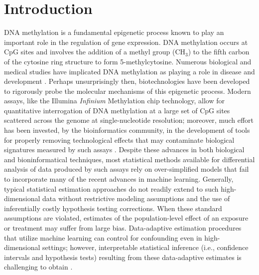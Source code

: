 \documentclass[9pt,a4paper,]{extarticle}
\theoremstyle{definition}
\theoremstyle{definition}
\theoremstyle{definition}
\theoremstyle{remark}
\begin{document}
\hypertarget{introduction}{%
\section{Introduction}\label{introduction}}

DNA methylation is a fundamental epigenetic process known to play an important
role in the regulation of gene expression. DNA methylation occurs at CpG sites
and involves the addition of a methyl group (\(\text{CH}_3\)) to the fifth carbon
of the cytosine ring structure to form 5-methylcytosine. Numerous biological and
medical studies have implicated DNA methylation as playing a role in disease and
development \citep{robertson2005dna}. Perhaps unsurprisingly then, biotechnologies
have been developed to rigorously probe the molecular mechanisms of this
epigenetic process. Modern assays, like the Illumina \emph{Infinium} Methylation chip
technology, allow for quantitative interrogation of DNA methylation at a large
set of CpG sites scattered across the genome at single-nucleotide resolution;
moreover, much effort has been invested, by the bioinformatics community, in the
development of tools for properly removing technological effects that may
contaminate biological signatures measured by such assays
\citep[dedeurwaerder2013comprehensive]{fortin2014functional}. Despite these
advances in both biological and bioninformatical techniques, most statistical
methods available for differential analysis of data produced by such assays rely
on over-simplified models that fail to incorporate many of the recent advances
in machine learning. Generally, typical statistical estimation approaches do not
readily extend to such high-dimensional data without restrictive modeling
assumptions and the use of inferentially costly hypothesis testing corrections.
When these standard assumptions are violated, estimates of the population-level
effect of an exposure or treatment may suffer from large bias. Data-adaptive
estimation procedures that utilize machine learning can control for confounding
even in high-dimensional settings; however, interpretable statistical inference
(i.e., confidence intervals and hypothesis tests) resulting from these
data-adaptive estimates is challenging to obtain \citep{libbrecht2015machine}.
\end{document}
